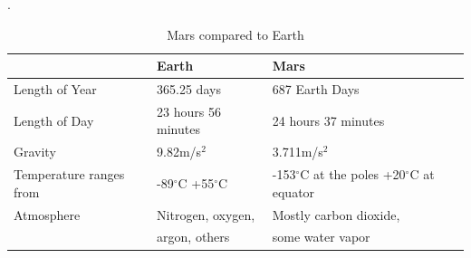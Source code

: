.
\begin{table} [h]
    \centering
    \begin{tabu} to 1\textwidth { | X[c] X[c] X[c] | }
     \hline
      & Earth & Mars \\ 
     \hline
     Length of Year & 365.25 days & 687 Earth Days \\
     \hline
     Length of Day & 23 hours 56 minutes & 24 hours 37 minutes \\
     \hline
     Gravity & 9.82m/s$^2$ & 3.711m/s$^2$ \\
     \hline
     Temperature ranges from & -89$^{\circ}$C +55$^{\circ}$C &-153$^{\circ}$C at the poles +20$^{\circ}$C at equator \\
     \hline
     Atmosphere & Nitrogen, oxygen, & Mostly carbon dioxide, \\
      & argon, others & some water vapor \\
     \hline
    \end{tabu}
    \caption{Mars compared to Earth\cite{MarsVSEarth}}
    \label{tab:marsEarthFacts}
\end{table}





